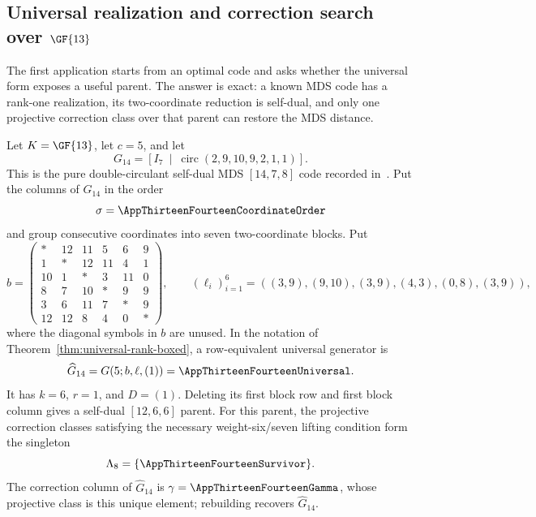 \subsection{Universal realization and correction search over
\texorpdfstring{$\GF{13}$}{GF(13)}}

The first application starts from an optimal code and asks whether the
universal form exposes a useful parent.  The answer is exact: a known MDS
code has a rank-one realization, its two-coordinate reduction is self-dual,
and only one projective correction class over that parent can restore the MDS
distance.

\begin{prop}
\label{prop:universal-mds-137}
\rm
Let \(K=\GF{13}\), let \(c=5\), and let
\[
G_{14}=\left[I_7\ \middle|\
\operatorname{circ}(2,9,10,9,2,1,1)\right].
\]
This is the pure double-circulant self-dual MDS \([14,7,8]\) code recorded
in~\cite{BetsumiyaEtAl}. Put the columns of \(G_{14}\) in the order
\[
\sigma=\AppThirteenFourteenCoordinateOrder
\]
and group consecutive coordinates into seven two-coordinate blocks. Put
\begin{equation}
b=\begin{pmatrix}
*&12&11&5&6&9\\
1&*&12&11&4&1\\
10&1&*&3&11&0\\
8&7&10&*&9&9\\
3&6&11&7&*&9\\
12&12&8&4&0&*
\end{pmatrix},
\qquad
(\ell_i)_{i=1}^6=((3,9),(9,10),(3,9),(4,3),(0,8),(3,9)),
\label{eq:gf13-14-coefficients}
\end{equation}
where the diagonal symbols in \(b\) are unused.  In the notation of
Theorem~\ref{thm:universal-rank-boxed}, a row-equivalent universal generator is
\begin{equation}
\widehat G_{14}=G(5;b,\ell,(1))=\AppThirteenFourteenUniversal.
\label{eq:gf13-14-structured-generator}
\end{equation}
It has \(k=6\), \(r=1\), and \(D=(1)\).  Deleting its first block row and
first block column gives a self-dual \([12,6,6]\) parent.  For this parent,
the projective correction classes satisfying the necessary weight-six/seven
lifting condition form the singleton
\[
\Lambda_8=\{\AppThirteenFourteenSurvivor\}.
\]
The correction column of \(\widehat G_{14}\) is
\(\gamma=\AppThirteenFourteenGamma\), whose projective class is this unique
element; rebuilding recovers \(\widehat G_{14}\).
\end{prop}

